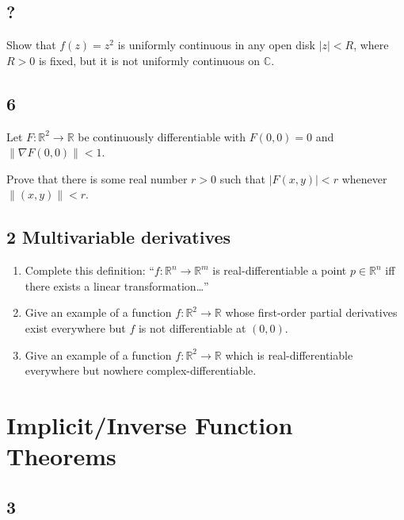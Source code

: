 \hypertarget{section-3}{%
\subsection{?}\label{section-3}}

Show that \(f(z) = z^2\) is uniformly continuous in any open disk
\(|z| < R\), where \(R>0\) is fixed, but it is not uniformly continuous
on \(\mathbb C\).

\hypertarget{section-4}{%
\subsection{6}\label{section-4}}

Let \(F:{\mathbb{R}}^2\to {\mathbb{R}}\) be continuously differentiable
with \(F(0, 0) = 0\) and
\({\left\lVert {\nabla F(0, 0)} \right\rVert} < 1\).

Prove that there is some real number \(r> 0\) such that
\({\left\lvert {F(x, y)} \right\rvert} < r\) whenever
\({\left\lVert {(x, y)} \right\rVert} < r\).

\hypertarget{multivariable-derivatives}{%
\subsection{2 Multivariable
derivatives}\label{multivariable-derivatives}}

\begin{enumerate}
\def\labelenumi{\alph{enumi}.}
\item
  Complete this definition: ``\(f: {\mathbb{R}}^n\to {\mathbb{R}}^m\) is
  real-differentiable a point \(p\in {\mathbb{R}}^n\) iff there exists a
  linear transformation\ldots{}''
\item
  Give an example of a function \(f:{\mathbb{R}}^2\to {\mathbb{R}}\)
  whose first-order partial derivatives exist everywhere but \(f\) is
  not differentiable at \((0, 0)\).
\item
  Give an example of a function \(f: {\mathbb{R}}^2 \to {\mathbb{R}}\)
  which is real-differentiable everywhere but nowhere
  complex-differentiable.
\end{enumerate}

\hypertarget{implicitinverse-function-theorems}{%
\section{Implicit/Inverse Function
Theorems}\label{implicitinverse-function-theorems}}

\hypertarget{section-5}{%
\subsection{3}\label{section-5}}


